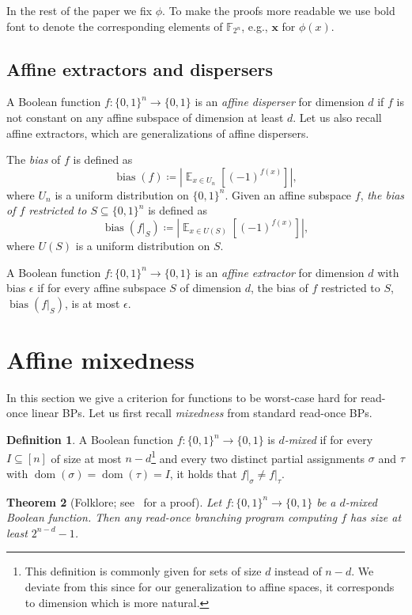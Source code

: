\documentclass[10pt,a4paper]{article}
\newtheorem{theorem}{Theorem}
\theoremstyle{definition}
\newtheorem{definition}[theorem]{Definition}
\theoremstyle{remark}
\DeclareMathOperator{\dom}{dom}
\DeclareMathOperator{\bias}{bias}
\DeclareMathOperator{\E}{\mathbb{E}}
\newcommand{\card}[1]{{\left|#1\right|}}
\newcommand{\iso}[1]{\mathbf{#1}}
\newcommand{\Q}{{\{0,1\}}}
\newcommand{\bbF}{\mathbb{F}}
\newcommand{\restr}[2]{\left.#1\right|_{#2}}
\newcommand{\readonce}{read-once}
\begin{document}
In the rest of the paper we fix $\phi$. To make the proofs more readable we use bold font to denote the corresponding elements of $\bbF_{2^n}$, e.g., $\iso{x}$ for $\phi(x)$.

\subsection{Affine extractors and dispersers}
A Boolean function $f\colon \Q^n \to \Q$ is an \emph{affine disperser} for dimension $d$ if $f$ is not constant on any affine subspace of dimension at least $d$.
Let us also recall affine extractors, which are generalizations of affine dispersers.

The \emph{bias} of $f$ is defined as
\[
  \bias(f) \coloneqq \card{\E_{x \in U_n}[(-1)^{f(x)}]},
\]
where $U_n$ is a uniform distribution on $\Q^n$.
Given an affine subspace $f$, \emph{the bias of $f$ restricted to $S \subseteq \Q^n$} is defined as
\[
  \bias(\restr{f}{S}) \coloneqq \card{\E_{x \in U(S)}[(-1)^{f(x)}]},
\]
where $U(S)$ is a uniform distribution on $S$.

A Boolean function $f\colon \Q^n \to \Q$ is an \emph{affine extractor} for dimension $d$ with bias $\epsilon$ if for every affine subspace $S$ of dimension $d$, the bias of $f$ restricted to $S$, $\bias(\restr{f}{S})$, is at most $\epsilon$.

\section{Affine mixedness}

In this section we give a criterion for functions to be worst-case hard for \readonce{} linear BPs. Let us first recall \emph{mixedness} from standard read-once BPs.

\begin{definition}
  A Boolean function $f\colon \Q^n \to \Q$ is \emph{$d$-mixed} if for every $I \subseteq [n]$ of size at most $n-d$\footnote{This definition is commonly given for sets of size $d$ instead of $n - d$. We deviate from this since for our generalization to affine spaces, it corresponds to dimension which is more natural.} and every two distinct partial assignments $\sigma$ and $\tau$ with $\dom(\sigma) = \dom(\tau) = I$, it holds that $\restr{f}{\sigma} \neq \restr{f}{\tau}$.
\end{definition}

\begin{theorem}[Folklore; see~\cite{DBLP:books/daglib/0028687} for a proof]\label{thm:mixedness_1bp}
  Let $f\colon \Q^n \to \Q$ be a $d$-mixed Boolean function. Then any read-once branching program computing $f$ has size at least $2^{n-d}-1$.
\end{theorem}
\end{document}
